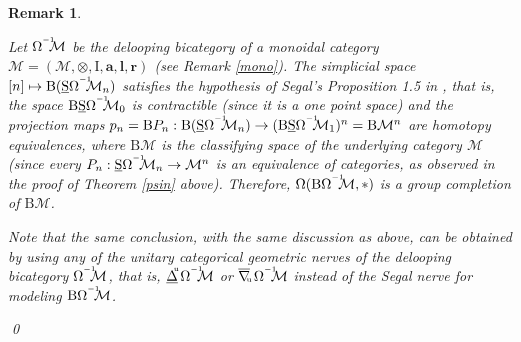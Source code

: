 \documentclass[]{amsart}
\newtheorem{remark}[theorem]{Remark}
\begin{document}
\begin{remark}\label{gp} {\em Let $\Omega^{^{-1}}\hspace{-5pt}{\ensuremath{\mathcal{M}}}$ be the delooping bicategory of a monoidal category
${\ensuremath{\mathcal{M}}}=({\ensuremath{\mathcal{M}}},\otimes,\text{I},\boldsymbol{a},\boldsymbol{l},\boldsymbol{r})$ (see Remark \ref{mono}).
The simplicial space $[n]\mapsto {\ensuremath{\mathrm{B}}} (\underline{\mathrm{S}}\Omega^{^{-1}}\hspace{-5pt}{\ensuremath{\mathcal{M}}}_n)$
satisfies the hypothesis of Segal's Proposition 1.5 in \cite{segal74}, that is, the space
${\ensuremath{\mathrm{B}}}\underline{\mathrm{S}}\Omega^{^{-1}}\hspace{-5pt}{\ensuremath{\mathcal{M}}}_0$ is contractible (since it is a one
point space) and the projection maps
 $p_n={\ensuremath{\mathrm{B}}} P_n:{\ensuremath{\mathrm{B}}} (\underline{\mathrm{S}}\Omega^{^{-1}}\hspace{-5pt}{\ensuremath{\mathcal{M}}}_n)\to ({\ensuremath{\mathrm{B}}} \underline{\mathrm{S}}\Omega^{^{-1}}\hspace{-5pt}{\ensuremath{\mathcal{M}}}_1)^n={\ensuremath{\mathrm{B}}}{\ensuremath{\mathcal{M}}}^n$
are homotopy equivalences, where ${\ensuremath{\mathrm{B}}}{\ensuremath{\mathcal{M}}}$ is the classifying space of the underlying category
${\ensuremath{\mathcal{M}}}$ (since every $P_n:\underline{\mathrm{S}}\Omega^{^{-1}}\hspace{-5pt}{\ensuremath{\mathcal{M}}}_n\to {\ensuremath{\mathcal{M}}}^n$ is an
equivalence of categories, as  observed in the proof of Theorem \ref{psin} above). Therefore, $
\Omega({\ensuremath{\mathrm{B}}}\Omega^{^{-1}}\hspace{-5pt}{\ensuremath{\mathcal{M}}},*)$  is a group completion of ${\ensuremath{\mathrm{B}}} {\ensuremath{\mathcal{M}}}$.

Note that the same conclusion, with the same discussion as above, can be obtained by using any of
the unitary categorical geometric nerves of the delooping bicategory
$\Omega^{^{-1}}\hspace{-5pt}{\ensuremath{\mathcal{M}}}$, that is,
${\ensuremath{\underline{\Delta}}}\hspace{-3pt}^{^\mathrm{u}}\Omega^{^{-1}}\hspace{-5pt}{\ensuremath{\mathcal{M}}}$ or
 $\overline{\nabla}\hspace{-2.5pt}_{^{_\mathrm{u}}}\Omega^{^{-1}}\hspace{-5pt}{\ensuremath{\mathcal{M}}}$ instead of the Segal nerve
  for modeling ${\ensuremath{\mathrm{B}}}\Omega^{^{-1}}\hspace{-5pt}{\ensuremath{\mathcal{M}}}$.
}\qed
\end{remark}
\end{document}
